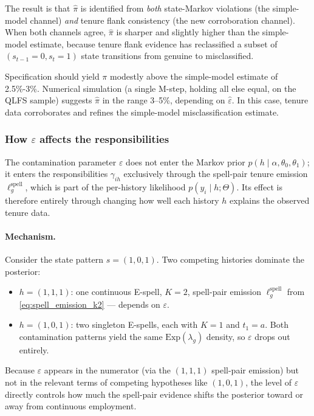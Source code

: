 The result is that \(\hat\pi\) is identified from \emph{both} state-Markov
violations (the simple-model channel) \emph{and} tenure flank consistency
(the new corroboration channel). When both channels agree, \(\hat\pi\) is
sharper and slightly higher than the simple-model estimate, because tenure
flank evidence has reclassified a subset of \((s_{t-1}=0, s_t=1)\) state
transitions from genuine to misclassified.

Specification should yield \(\pi\) modestly
above the simple-model estimate of 2.5\%-3\%. Numerical simulation (a single
M-step, holding all else equal, on the QLFS sample) suggests \(\hat\pi\)
in the range 3--5\%, depending on \(\hat\varepsilon\). 
In this case, tenure data corroborates and refines the simple-model misclassification
estimate.

\subsubsection{How \(\varepsilon\) affects the responsibilities}
\label{sec:eps_affects_gamma}

The contamination parameter \(\varepsilon\) does not enter the Markov
prior \(p(h \mid \alpha,\theta_0,\theta_1)\); it enters the
responsibilities \(\gamma_{ih}\) exclusively through the spell-pair
tenure emission \(\ell_g^{\mathrm{spell}}\), which is part of the
per-history likelihood \(p(y_i \mid h; \Theta)\). Its effect is
therefore entirely through changing how well each history \(h\) explains
the observed tenure data.

\paragraph{Mechanism.}
Consider the state pattern \(s = (1,0,1)\). Two competing histories
dominate the posterior:
\begin{itemize}
\item \(h = (1,1,1)\): one continuous E-spell, \(K = 2\), spell-pair
  emission \(\ell_g^{\mathrm{spell}}\) from \eqref{eq:spell_emission_k2}
  --- depends on \(\varepsilon\).
\item \(h = (1,0,1)\): two singleton E-spells, each with \(K = 1\) and
  \(t_1 = a\). Both contamination patterns yield the same
  \(\mathrm{Exp}(\lambda_g)\) density, so \(\varepsilon\) drops out
  entirely.
\end{itemize}
Because \(\varepsilon\) appears in the numerator (via the \((1,1,1)\)
spell-pair emission) but not in the relevant terms of competing
hypotheses like \((1,0,1)\), the level of \(\varepsilon\) directly
controls how much the spell-pair evidence shifts the posterior toward or
away from continuous employment.

